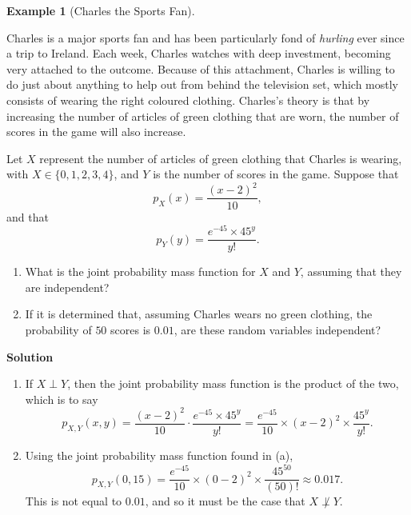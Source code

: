 \documentclass[
  letterpaper,
  DIV=11,
  numbers=noendperiod]{scrreprt}
\providecommand{\tightlist}{%
  \setlength{\itemsep}{0pt}\setlength{\parskip}{0pt}}\usepackage{longtable,booktabs,array}
\theoremstyle{definition}
\theoremstyle{definition}
\theoremstyle{definition}
\newtheorem{example}{Example}[chapter]
\theoremstyle{remark}
\begin{document}
\begin{example}[Charles the Sports
Fan]\protect\hypertarget{exm-pmf-independence}{}\label{exm-pmf-independence}

Charles is a major sports fan and has been particularly fond of
\emph{hurling} ever since a trip to Ireland. Each week, Charles watches
with deep investment, becoming very attached to the outcome. Because of
this attachment, Charles is willing to do just about anything to help
out from behind the television set, which mostly consists of wearing the
right coloured clothing. Charles's theory is that by increasing the
number of articles of green clothing that are worn, the number of scores
in the game will also increase.

Let \(X\) represent the number of articles of green clothing that
Charles is wearing, with \(X \in \{0,1,2,3,4\}\), and \(Y\) is the
number of scores in the game. Suppose that
\[p_X(x) = \frac{(x-2)^2}{10},\] and that
\[p_Y(y) = \frac{e^{-45}\times 45^y}{y!}.\]

\begin{enumerate}
\def\labelenumi{\alph{enumi}.}
\tightlist
\item
  What is the joint probability mass function for \(X\) and \(Y\),
  assuming that they are independent?
\item
  If it is determined that, assuming Charles wears no green clothing,
  the probability of \(50\) scores is \(0.01\), are these random
  variables independent?
\end{enumerate}

\begin{tcolorbox}[enhanced jigsaw, colback=white, breakable, rightrule=.15mm, leftrule=.75mm, toprule=.15mm, left=2mm, arc=.35mm, opacityback=0, bottomrule=.15mm]

\vspace{-3mm}\textbf{Solution}\vspace{3mm}

\begin{enumerate}
\def\labelenumi{\alph{enumi}.}
\item
  If \(X\perp Y\), then the joint probability mass function is the
  product of the two, which is to say
  \[p_{X,Y}(x,y) = \frac{(x-2)^2}{10}\cdot\frac{e^{-45}\times 45^y}{y!} = \frac{e^{-45}}{10}\times (x-2)^2 \times \frac{45^y}{y!}.\]
\item
  Using the joint probability mass function found in (a),
  \[p_{X,Y}(0, 15) = \frac{e^{-45}}{10}\times (0-2)^2 \times \frac{45^{50}}{(50)!} \approx 0.017.\]
  This is not equal to \(0.01\), and so it must be the case that
  \(X\not\perp Y\).
\end{enumerate}

\end{tcolorbox}

\end{example}
\end{document}

